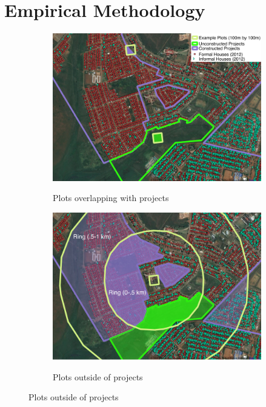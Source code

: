 \documentclass[12pt]{article}
\begin{document}
\section{Empirical Methodology}\label{section:methodology}


\begin{figure}[hbtp]
    \caption{Measuring Spatial Exposure to \\ Example Housing Projects}
    \label{fig:spatialexposure}
    \centering
    \vspace{2mm}
    \begin{subfigure}[b]{.8\textwidth}
        \centering
        \caption[]{\small Plots overlapping with projects}  
        \vspace{-1mm}
        \includegraphics[width=\textwidth,trim={.2cm .2cm .2cm 0cm}, clip=true]{figures/exp_3_small_legend_75.png}
        \label{fig:insideproj}
    \end{subfigure}
    \vskip 1mm \vskip 0pt
    \begin{subfigure}[b]{.8\textwidth}  
        \centering 
        \caption[]{\small Plots outside of projects}
        \vspace{-1mm}
        \includegraphics[width=\textwidth,trim={.2cm .2cm .2cm 0cm}, clip=true]{figures/exp_2_ring_75.png}
        \label{fig:outsideproj}
    \end{subfigure}
\end{figure} 
\end{document}
